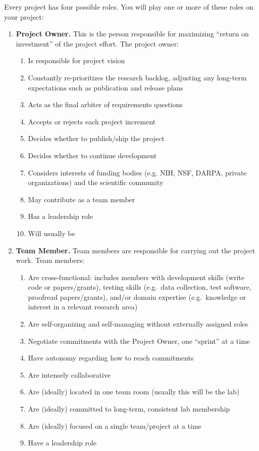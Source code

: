 \documentclass{tufte-book} %
\begin{document}
\noindent Every project has four possible roles.  You will play one or more of
these roles on your project:
\begin{enumerate}
\item \textbf{Project Owner.}  This is the person responsible for
  maximizing ``return on investment'' of the project effort.  The project owner:
\begin{enumerate}
\item Is responsible for project vision
\item Constantly re-prioritizes the research backlog, adjusting any
  long-term expectations such as publication and release plans
\item Acts as the final arbiter of requirements questions
\item Accepts or rejects each project increment
\item Decides whether to publish/ship the project
\item Decides whether to continue development
\item Considers interests of funding bodies (e.g. NIH, NSF, DARPA,
  private organizations) and the scientific community
\item May contribute as a team member
\item Has a leadership role
\item Will usually be \director
\end{enumerate}

\item \textbf{Team Member.}  Team members are responsible for carrying
  out the project work.  Team members:
\begin{enumerate}
\item Are cross-functional: includes members with development skills
  (write code or papers/grants), testing skills (e.g.\ data
  collection, test software, proofread papers/grants), and/or domain
  expertise (e.g.\ knowledge or interest in a relevant research area)
\item Are self-organizing and self-managing without externally assigned
  roles
\item Negotiate commitments with the Project Owner, one ``sprint'' at
  a time
\item Have autonomy regarding how to reach commitments
\item Are intensely collaborative
\item Are (ideally) located in one team room (usually this will be the lab)
\item Are (ideally) committed to long-term, consistent lab membership
\item Are (ideally) focused on a single team/project at a time
\item Have a leadership role
\end{enumerate}


\end{enumerate}
\end{document}
